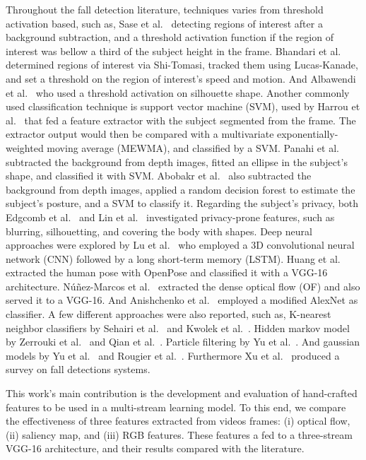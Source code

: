 \documentclass[conference]{IEEEtran}
\begin{document}
Throughout the fall detection literature, techniques varies from threshold activation based, such as, Sase et al.~\cite{sase2018human} detecting regions of interest after a background subtraction, and a threshold activation function if the region of interest was bellow a third of the subject height in the frame. Bhandari et al.~\cite{bhandari2017novel} determined regions of interest via Shi-Tomasi, tracked them using Lucas-Kanade, and set a threshold on the region of interest's speed and motion. And Albawendi et al.~\cite{albawendi2018video} who used a threshold activation on silhouette shape. Another commonly used classification technique is support vector machine (SVM), used by Harrou et al.~\cite{harrou2017vision} that fed a feature extractor with the subject segmented from the frame. The extractor output would then be compared with a multivariate exponentially-weighted moving average (MEWMA), and classified by a SVM. Panahi et al.~\cite{panahi2018human} subtracted the background from depth images, fitted an ellipse in the subject's shape, and classified it with SVM. Abobakr et al.~\cite{abobakr2017skeleton} also subtracted the background from depth images, applied a random decision forest to estimate the subject's posture, and a SVM to classify it. Regarding the subject's privacy, both Edgcomb et al.~\cite{edgcomb2012automated} and Lin et al.~\cite{lin2013fall} investigated privacy-prone features, such as blurring, silhouetting, and covering the body with shapes. Deep neural approaches were explored by Lu et al.~\cite{lu2018deep} who employed a 3D convolutional neural network (CNN) followed by a long short-term memory (LSTM). Huang et al.~\cite{huang2018video} extracted the human pose with OpenPose and classified it with a VGG-16 architecture. N\'u\~nez-Marcos et al.~\cite{nunez2017vision} extracted the dense optical flow (OF) and also served it to a VGG-16. And Anishchenko et al.~\cite{anishchenko2018machine} employed a modified AlexNet as classifier. A few different approaches were also reported, such as, K-nearest neighbor classifiers by Sehairi et al.~\cite{sehairi2018elderly} and Kwolek et al.~\cite{kwolek2015improving}. Hidden markov model by Zerrouki et al.~\cite{zerrouki2018combined} and Qian et al.~\cite{qian2017recognizing}. Particle filtering by Yu et al.~\cite{yu2009fall}. And gaussian models by Yu et al.~\cite{yu2010robust} and Rougier et al.~\cite{rougier2011robust}. Furthermore Xu et al.~\cite{xu2018new} produced a survey on fall detections systems.

This work's main contribution is the development and evaluation of hand-crafted features to be used in a multi-stream learning model. To this end, we compare the effectiveness of three features extracted from videos frames: (i) optical flow, (ii) saliency map, and (iii) RGB features. These features a fed to a three-stream VGG-16 architecture, and their results compared with the literature.
\end{document}
